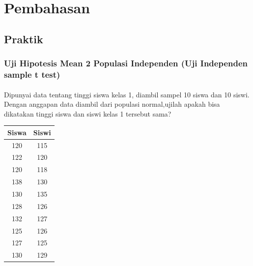 \documentclass[a4paper,12pt]{article}
\begin{document}
\section{Pembahasan}
\subsection{Praktik}
\subsubsection{Uji Hipotesis Mean 2 Populasi Independen (Uji Independen sample t test) }
\paragraph* {}
Dipunyai data tentang tinggi siswa kelas 1, diambil sampel 10 siswa dan 10 siswi. Dengan anggapan data diambil dari populasi normal,ujilah apakah bisa dikatakan tinggi siswa dan siswi kelas 1
tersebut sama?
\begin{table}[!ht]
    \centering
\begin{tabular}{|c|c|}
\hline
Siswa & Siswi \\ \hline
120   & 115   \\ \hline
122   & 120   \\ \hline
120   & 118   \\ \hline
138   & 130   \\ \hline
130   & 135   \\ \hline
128   & 126   \\ \hline
132   & 127   \\ \hline
125   & 126   \\ \hline
127   & 125   \\ \hline
130   & 129   \\ \hline
\end{tabular}
\end{table}
\end{document}
